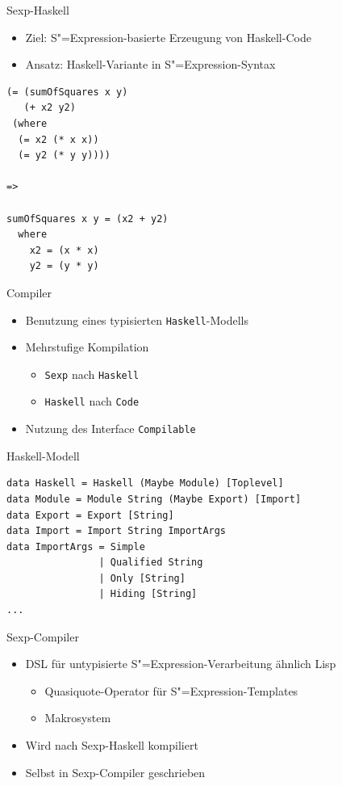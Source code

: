\documentclass{beamer}
\newcommand{\sexp}{S"=Expression}
\begin{document}
\begin{frame}[fragile]{Sexp-Haskell}
  \begin{itemize}
  \item Ziel: \sexp{}-basierte Erzeugung von Haskell-Code
  \item Ansatz: Haskell-Variante in \sexp{}-Syntax
  \end{itemize}
\begin{verbatim}
(= (sumOfSquares x y)
   (+ x2 y2)
 (where                   
  (= x2 (* x x))
  (= y2 (* y y))))

=>

sumOfSquares x y = (x2 + y2)
  where
    x2 = (x * x)         
    y2 = (y * y)
\end{verbatim}
\end{frame}

\begin{frame}[fragile]{Compiler}
  \begin{itemize}
  \item Benutzung eines typisierten \verb+Haskell+-Modells
  \item Mehrstufige Kompilation
    \begin{itemize}
    \item \verb+Sexp+ nach \verb+Haskell+
    \item \verb+Haskell+ nach \verb+Code+
    \end{itemize}
  \item Nutzung des Interface \verb+Compilable+
  \end{itemize}
\end{frame}

\begin{frame}[fragile]{Haskell-Modell}
\begin{verbatim}
data Haskell = Haskell (Maybe Module) [Toplevel]
data Module = Module String (Maybe Export) [Import]
data Export = Export [String]
data Import = Import String ImportArgs
data ImportArgs = Simple
                | Qualified String
                | Only [String]
                | Hiding [String]  
...
\end{verbatim}
\end{frame}

\begin{frame}[fragile]{Sexp-Compiler}
  \begin{itemize}
  \item DSL für untypisierte \sexp{}-Verarbeitung ähnlich Lisp
    \begin{itemize}
    \item Quasiquote-Operator für \sexp{}-Templates
    \item Makrosystem
    \end{itemize}
  \item Wird nach Sexp-Haskell kompiliert
  \item Selbst in Sexp-Compiler geschrieben
  \end{itemize}
\end{frame}
\end{document}

